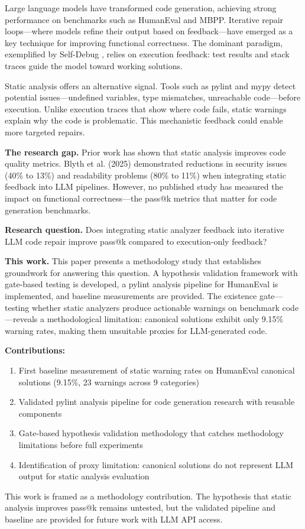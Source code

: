 
Large language models have transformed code generation, achieving strong performance on benchmarks such as HumanEval and MBPP. Iterative repair loops---where models refine their output based on feedback---have emerged as a key technique for improving functional correctness. The dominant paradigm, exemplified by Self-Debug \citep{chen2023selfdebug}, relies on execution feedback: test results and stack traces guide the model toward working solutions.

Static analysis offers an alternative signal. Tools such as pylint and mypy detect potential issues---undefined variables, type mismatches, unreachable code---before execution. Unlike execution traces that show where code fails, static warnings explain why the code is problematic. This mechanistic feedback could enable more targeted repairs.

\textbf{The research gap.} Prior work has shown that static analysis improves code quality metrics. Blyth et al. (2025) demonstrated reductions in security issues (40\% to 13\%) and readability problems (80\% to 11\%) when integrating static feedback into LLM pipelines. However, no published study has measured the impact on functional correctness---the pass@k metrics that matter for code generation benchmarks.

\textbf{Research question.} Does integrating static analyzer feedback into iterative LLM code repair improve pass@k compared to execution-only feedback?

\textbf{This work.} This paper presents a methodology study that establishes groundwork for answering this question. A hypothesis validation framework with gate-based testing is developed, a pylint analysis pipeline for HumanEval is implemented, and baseline measurements are provided. The existence gate---testing whether static analyzers produce actionable warnings on benchmark code---reveals a methodological limitation: canonical solutions exhibit only 9.15\% warning rates, making them unsuitable proxies for LLM-generated code.

\textbf{Contributions:}

\begin{enumerate}
\item First baseline measurement of static warning rates on HumanEval canonical solutions (9.15\%, 23 warnings across 9 categories)
\item Validated pylint analysis pipeline for code generation research with reusable components
\item Gate-based hypothesis validation methodology that catches methodology limitations before full experiments
\item Identification of proxy limitation: canonical solutions do not represent LLM output for static analysis evaluation
\end{enumerate}

This work is framed as a methodology contribution. The hypothesis that static analysis improves pass@k remains untested, but the validated pipeline and baseline are provided for future work with LLM API access.
